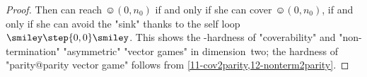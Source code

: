 \begin{proof}
  Then \Eve can reach $\smiley(0,n_0)$ if and only if she can cover
  $\smiley(0,n_0)$, if and only if she can avoid the "sink" thanks to
  the self loop $\smiley\step{0,0}\smiley$.  This
  shows the \EXP-hardness of "coverability" and "non-termination"
  "asymmetric" "vector games" in dimension~two; the hardness of
  "parity@parity vector game" follows
  from \cref{11-cov2parity,12-nonterm2parity}.
\end{proof}



